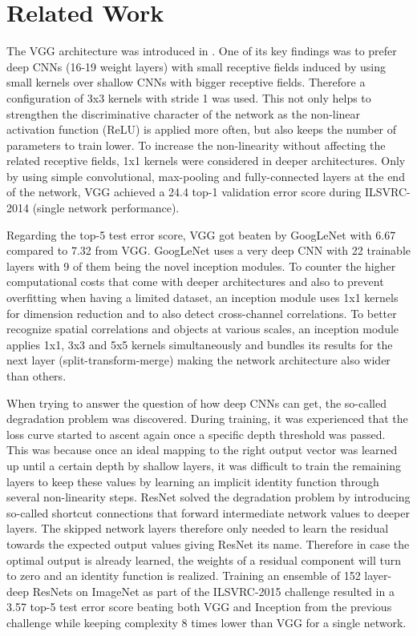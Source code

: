 \section{Related Work} \label{related_work}

The VGG architecture was introduced in \cite{KarenSimonyan.2014}. One of its key findings was to prefer deep CNNs (16-19 weight layers) with small receptive fields induced by using small kernels over shallow CNNs with bigger receptive fields. Therefore a configuration of 3x3 kernels with stride 1 was used. This not only helps to strengthen the discriminative character of the network as the non-linear activation function (ReLU) is applied more often, but also keeps the number of parameters to train lower. To increase the non-linearity without affecting the related receptive fields, 1x1 kernels were considered in deeper architectures. Only by using simple convolutional, max-pooling and fully-connected layers at the end of the network, VGG achieved a 24.4 top-1 validation error score during ILSVRC-2014 (single network performance). \cite{KarenSimonyan.2014}

Regarding the top-5 test error score, VGG got beaten by GoogLeNet with 6.67 compared to 7.32 from VGG. GoogLeNet uses a very deep CNN with 22 trainable layers with 9 of them being the novel inception modules. To counter the higher computational costs that come with deeper architectures and also to prevent overfitting when having a limited dataset, an inception module uses 1x1 kernels for dimension reduction and to also detect cross-channel correlations. To better recognize spatial correlations and objects at various scales, an inception module applies 1x1, 3x3 and 5x5 kernels simultaneously and bundles its results for the next layer (split-transform-merge) making the network architecture also wider than others. \cite{ChristianSzegedy.2014}

When trying to answer the question of how deep CNNs can get, the so-called degradation problem was discovered. During training, it was experienced that the loss curve started to ascent again once a specific depth threshold was passed. This was because once an ideal mapping to the right output vector was learned up until a certain depth by shallow layers, it was difficult to train the remaining layers to keep these values by learning an implicit identity function through several non-linearity steps. ResNet solved the degradation problem by introducing so-called shortcut connections that forward intermediate network values to deeper layers. The skipped network layers therefore only needed to learn the residual towards the expected output values giving ResNet its name. Therefore in case the optimal output is already learned, the weights of a residual component will turn to zero and an identity function is realized. Training an ensemble of 152 layer-deep ResNets on ImageNet as part of the ILSVRC-2015 challenge resulted in a 3.57 top-5 test error score beating both VGG and Inception from the previous challenge while keeping complexity 8 times lower than VGG for a single network. \cite{KaimingHe.2015}

